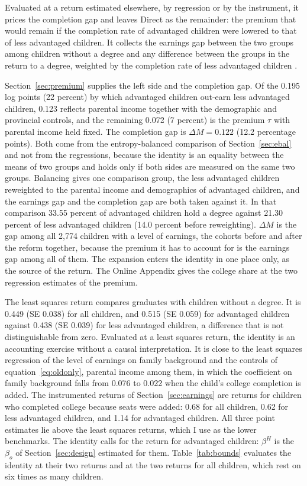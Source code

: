 \documentclass[11pt]{article}
\begin{document}
Evaluated at a return estimated elsewhere, by regression or by the instrument, it prices the completion gap and leaves Direct as the remainder: the premium that would remain if
the completion rate of advantaged children were lowered to that of
less advantaged children. It collects the earnings gap between the two
groups among children without a degree and any difference between the
groups in the return to a degree, weighted by the completion rate of
less advantaged children \citep{HeckmanPinto2015}.

Section~\ref{sec:premium} supplies the left side and the completion gap. Of the 0.195 log points (22 percent) by which advantaged children out-earn less advantaged children, 0.123 reflects parental income together with the demographic
and provincial controls, and the remaining 0.072 (7 percent) is the premium $\tau$ with parental income held fixed. The completion gap is $\Delta M = 0.122$ (12.2 percentage points). Both come from the entropy-balanced
comparison of Section~\ref{sec:ebal} and not from the regressions,
because the identity is an equality between the means of two groups and
holds only if both sides are measured on the same two groups. Balancing
gives one comparison group, the less advantaged children reweighted to
the parental income and demographics of advantaged children, and the
earnings gap and the completion gap are both taken against it. In that comparison 33.55 percent of advantaged children hold a degree against 21.30 percent of less advantaged children (14.0 percent before reweighting). $\Delta M$ is the gap among all 2,774
children with a level of earnings, the cohorts before and after the reform together, because the
premium it has to account for is the earnings gap among all of them.
The expansion enters the identity in one place only, as the source of
the return. The Online Appendix gives the college share at the two regression estimates of the premium.

The least squares return compares
graduates with children without a degree. It is 0.449 (SE 0.038) for all
children, and 0.515 (SE 0.059) for advantaged children against 0.438
(SE 0.039) for less advantaged children, a difference that is not
distinguishable from zero. Evaluated at a least squares return, the identity is an accounting
exercise without a causal interpretation. It is close to the least squares regression of the level of earnings on family background and the
controls of equation~\eqref{eq:oldonly}, parental income among them, in which the coefficient on family
background falls from 0.076 to 0.022 when the child's college
completion is added. The instrumented returns of
Section~\ref{sec:earnings} are returns for children who completed
college because seats were added: 0.68 for all children, 0.62 for
less advantaged children, and 1.14 for advantaged children. All three point estimates lie above the least squares returns, which I use as the lower benchmarks. The identity calls for the return for advantaged children: $\beta^{H}$ is the $\beta_o$ of Section~\ref{sec:design} estimated for them. Table~\ref{tab:bounds} evaluates the identity at their two returns and at the two returns for all children, which rest on six times as many children.
\end{document}
